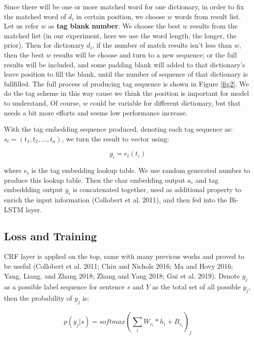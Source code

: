 \documentclass[letterpaper]{article} %
\begin{document}
Since there will be one or more matched word for one dictionary, in order to fix the matched word of $d_i$ in certain position, we choose $w$ words from result list. Let us refer $w$ as \textbf{tag blank number}. We choose the best $w$ results from the matched list (in our experiment, here we use the word length, the longer, the prior). Then for dictionary $d_i$, if the number of match results isn't less than $w$, then the best $w$ results will be choose and turn to a new sequence; or the full results will be included, and some padding blank will added to that dictionary's leave position to fill the blank, until the number of sequence of that dictionary is fullfilled.  The full process of producing tag sequence is shown in Figure \ref{fig2}. We do the tag scheme in this way cause we think the position is important for model to understand, Of course, $w$ could be variable for different dictionary, but that needs a bit more efforts and seems low performance increase.

With the tag embedding sequence produced, denoting each tag sequence as: $s_t = (t_1, t_2, ..., t_n)$, we turn the result to vector using: 

\begin{equation}
g_i = e_t(t_i) \label{tag_embedding}
\end{equation}

where $e_t$ is the tag embedding lookup table. We use random generated number to produce this lookup table. Then the char embedding output $a_i$ and tag embeddding output $g_i$ is concatenated together, used as additional property to enrich the input information (Collobert et al. 2011), and then fed into the Bi-LSTM layer.  

\subsection{Loss and Training}

CRF layer is applied on the top, same with many previous works and proved to be useful (Collobert et al. 2011; Chiu and Nichols 2016; Ma and Hovy 2016; Yang, Liang, and Zhang 2018; Zhang and Yang 2018; Gui et al. 2019). Denote $y_j$ as a possible label sequence for sentence $s$ and $Y$ as the total set of all possible $y_j$, then the probability of $y_j$ is:

\begin{equation}
p(y_j | s) = softmax(\sum_i{W_{c_i} * h_i} + B_{c_i})_j
\label{crf_probability}
\end{equation}
\end{document}
